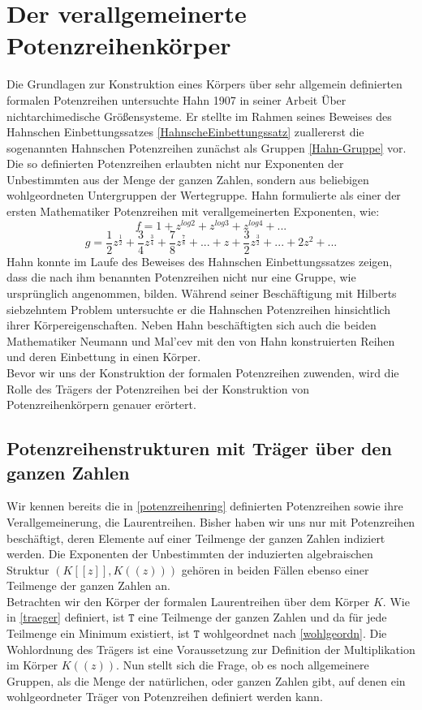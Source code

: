 \section{Der verallgemeinerte Potenzreihenkörper}
%
Die Grundlagen zur Konstruktion eines Körpers über sehr allgemein definierten formalen Potenzreihen untersuchte Hahn 1907 in seiner Arbeit \glqq Über nichtarchimedische Größensysteme\grqq. Er stellte im Rahmen seines Beweises des Hahnschen Einbettungssatzes \ref{HahnscheEinbettungssatz} zuallererst die sogenannten Hahnschen Potenzreihen zunächst als Gruppen \ref{Hahn-Gruppe} vor. Die so definierten Potenzreihen erlaubten nicht nur Exponenten der Unbestimmten aus der Menge der ganzen Zahlen, sondern aus beliebigen wohlgeordneten Untergruppen der Wertegruppe. Hahn formulierte als einer der ersten Mathematiker Potenzreihen mit verallgemeinerten Exponenten, wie:\\
\[ f = 1 + z^{log 2} + z^{log 3} + z^{log 4} + ... \]
\[g = \frac{1}{2}z^{\frac{1}{2}} + \frac{3}{4}z^\frac{3}{4} + \frac{7}{8}z^\frac{7}{8} + ... + z + \frac{3}{2}z^\frac{3}{2} + ... + 2z^2 + ...\] 
Hahn konnte im Laufe des Beweises des Hahnschen Einbettungssatzes zeigen, dass die nach ihm benannten Potenzreihen nicht nur eine Gruppe, wie ursprünglich angenommen, bilden.  Während seiner Beschäftigung mit Hilberts siebzehntem Problem untersuchte er die Hahnschen Potenzreihen hinsichtlich ihrer Körpereigenschaften. Neben Hahn beschäftigten sich auch die beiden Mathematiker Neumann und Mal'cev mit den von Hahn konstruierten Reihen und deren Einbettung in einen Körper. \\
Bevor wir uns der Konstruktion der formalen Potenzreihen zuwenden, wird die Rolle des Trägers der Potenzreihen bei der Konstruktion von Potenzreihenkörpern genauer erörtert. 

\subsection{Potenzreihenstrukturen mit Träger über den ganzen Zahlen}\label{traegerGanz}
Wir kennen bereits die in \ref{potenzreihenring} definierten Potenzreihen sowie ihre Verallgemeinerung, die Laurentreihen. Bisher haben wir uns nur mit Potenzreihen beschäftigt, deren Elemente auf einer Teilmenge der ganzen Zahlen indiziert werden. Die Exponenten der Unbestimmten der induzierten algebraischen Struktur $\left(K[[z]], K((z))\right) $ gehören in beiden Fällen ebenso einer Teilmenge der ganzen Zahlen an. \\
Betrachten wir den Körper der formalen Laurentreihen über dem Körper $K$. Wie in \ref{traeger} definiert, ist $\mathtt{T}$ eine Teilmenge der ganzen Zahlen und da für jede Teilmenge ein Minimum existiert, ist $\mathtt{T}$ wohlgeordnet nach \ref{wohlgeordn}. Die Wohlordnung des Trägers ist eine Voraussetzung zur Definition der Multiplikation im Körper $K((z))$. Nun stellt sich die Frage, ob es noch allgemeinere Gruppen, als die Menge der natürlichen, oder ganzen Zahlen gibt, auf denen ein wohlgeordneter Träger von Potenzreihen definiert werden kann.
%
%
